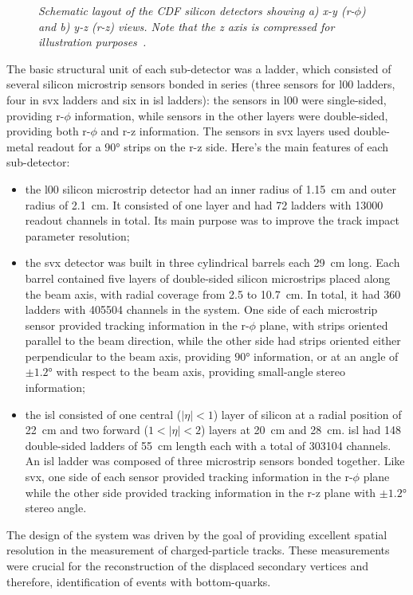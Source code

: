 \begin{figure}[!htbp]
  \centering {} 
  \caption{\textit{Schematic layout of the CDF silicon detectors showing a) x-y
      (r-$\phi$) and b) y-z (r-z) views. Note that the z axis is compressed for
      illustration purposes~\cite{Aaltonen}.}}\label{cdf_b}
\end{figure}
The basic structural unit of each sub-detector was a ladder, which consisted of
several silicon microstrip sensors bonded in series (three sensors for \gls{l00}
ladders, four in \gls{svx} ladders and six in \gls{isl} ladders): the sensors in
\gls{l00} were single-sided, providing r-$\phi$ information, while sensors in
the other layers were double-sided, providing both r-$\phi$ and r-z
information. The sensors in \gls{svx} layers used double-metal readout for a
$\ang{90}$ strips on the r-z side. Here's the main features of each
sub-detector:
\begin{itemize}
\item the \gls{l00} silicon microstrip detector had an inner radius of 1.15~cm
  and outer radius of 2.1~cm. It consisted of one layer and had 72 ladders with
  13000 readout channels in total. Its main purpose was to improve the track
  impact parameter resolution;
\item the \gls{svx} detector was built in three cylindrical barrels each 29~cm
  long. Each barrel contained five layers of double-sided silicon microstrips
  placed along the beam axis, with radial coverage from 2.5 to 10.7~cm. In
  total, it had 360 ladders with 405504 channels in the system. One side of each
  microstrip sensor provided tracking information in the r-$\phi$ plane, with
  strips oriented parallel to the beam direction, while the other side had
  strips oriented either perpendicular to the beam axis, providing $\ang{90}$
  information, or at an angle of $\pm\ang{1.2}$ with respect to the beam axis,
  providing small-angle stereo information;
\item the \gls{isl} consisted of one central ($|\eta| < 1$) layer of silicon at
  a radial position of 22~cm and two forward ($1 < |\eta| < 2$) layers at 20~cm
  and 28~cm. \gls{isl} had 148 double-sided ladders of 55~cm length each with a
  total of 303104 channels. An \gls{isl} ladder was composed of three microstrip
  sensors bonded together. Like \gls{svx}, one side of each sensor provided
  tracking information in the r-$\phi$ plane while the other side provided
  tracking information in the r-z plane with $\pm\ang{1.2}$ stereo angle.
\end{itemize}
The design of the system was driven by the goal of providing excellent spatial
resolution in the measurement of charged-particle tracks. These measurements
were crucial for the reconstruction of the displaced secondary vertices and
therefore, identification of events with bottom-quarks.

